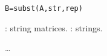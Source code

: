 
\begin{mandesc}
\end{mandesc}
\begin{calling_sequence}
\begin{verbatim}
B=subst(A,str,rep)
\end{verbatim}
\end{calling_sequence}

\begin{parameters}
  \begin{varlist}
     : string matrices.
     : strings.
  \end{varlist}
\end{parameters}

\begin{mandescription}
\ldots 
\end{mandescription}

